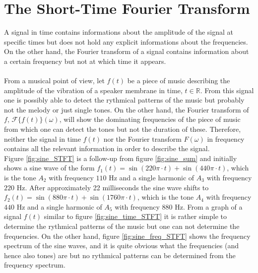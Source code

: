 \section{The Short-Time Fourier Transform}
A signal in time contains informations about the amplitude of the signal at specific times but does not hold any explicit informations about the frequencies. On the other hand, the Fourier transform of a signal contains information about a certain frequency but not at which time it appears.
\\ \\
From a musical point of view, let $f(t)$ be a piece of music describing the amplitude of the vibration of a speaker membrane in time, $t \in \mathbb{R}$. From this signal one is possibly able to detect the rythmical patterns of the music but probably not the melody or just single tones. On the other hand, the Fourier transform of $f$, $\mathcal{F}\{f(t)\}(\omega)$, will show the dominating frequencies of the piece of music from which one can detect the tones but not the duration of these. Therefore, neither the signal in time $f(t)$ nor the Fourier transform $F(\omega)$ in frequency contains all the relevant information in order to describe the signal.
\\
Figure \ref{fig:sine_STFT} is a follow-up from figure \ref{fig:sine_sum} and initially shows a sine wave of the form $f_1(t) = \sin(220\pi\cdot t) + \sin(440\pi\cdot t)$, which is the tone $A_2$ with frequency $110$ Hz and a single harmonic of $A_3$ with frequency $220$ Hz. After approximately 22 milliseconds the sine wave shifts to $f_2(t) = \sin(880\pi\cdot t) + \sin(1760\pi\cdot t)$, which is the tone $A_4$ with frequency $440$ Hz and a single harmonic of $A_5$ with frequency $880$ Hz. From a graph of a signal $f(t)$ similar to figure \ref{fig:sine_time_STFT} it is rather simple to determine the rythmical patterns of the music but one can not determine the frequencies. On the other hand, figure \ref{fig:sine_freq_STFT} shows the frequency spectrum of the sine waves, and it is quite obvious what the frequencies (and hence also tones) are but no rythmical patterns can be determined from the frequency spectrum.

